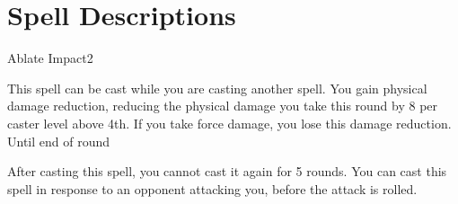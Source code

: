 \section{Spell Descriptions}

\small

\begin{comment}
\subsubsection{A}
\end{comment}


\begin{spellsection}{Ablate Impact}{2}
\begin{spellheader}
\end{spellheader}
\begin{spellcontent}
    \begin{spelltargetinginfo}
    \end{spelltargetinginfo}
    \begin{spelleffects}
        \spellspecial This spell can be cast while you are casting another spell.
        \spelleffect You gain physical damage reduction, reducing the physical damage you take this round by 8  per caster level above 4th. If you take force damage, you lose this damage reduction.
        \spelldur Until end of round
    \end{spelleffects}
\end{spellcontent}
\begin{spellfooter}
    \spellnotes After casting this spell, you cannot cast it again for 5 rounds. You can cast this spell in response to an opponent attacking you, before the attack is rolled.
\end{spellfooter}
\end{spellsection}

